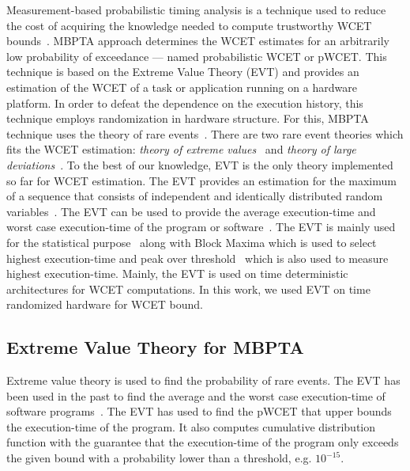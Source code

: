 Measurement-based probabilistic timing analysis is a technique used to reduce the cost of acquiring the knowledge needed to compute trustworthy WCET bounds~\cite{hansen2009statistical, cucu2012measurement, kosmidis2014pub}. MBPTA approach determines the WCET estimates for an arbitrarily low probability of exceedance --- named probabilistic WCET or pWCET. This technique is based on the Extreme Value Theory (EVT) and provides an estimation of the WCET of a task or application running on a hardware platform. In order to defeat the dependence on the execution history, this technique employs randomization in hardware structure. For this, MBPTA technique uses the theory of rare events~\cite{Cazorla:2013:PPA:2465787.2465796}. There are two rare event theories which fits the WCET estimation: \textit{theory of extreme values}~\cite{gumbel1954statistical} and \textit{theory of large deviations}~\cite{gumbel1954statistical}. To the best of our knowledge, EVT is the only theory implemented so far for WCET estimation. The EVT provides an estimation for the maximum of a sequence that consists of independent and identically distributed random variables~\cite{hoeffding1963probability}. The EVT can be used to provide the average execution-time and worst case execution-time of the program or software~\cite{cazorla2013upper,anwar2015probabilistically}. The EVT is mainly used for the statistical purpose~\cite{gumbel1954statistical} along with Block Maxima \cite{gumbel1954statistical} which is used to select highest execution-time and  peak over threshold~\cite{gumbel1954statistical} which is also used to measure highest execution-time. Mainly, the EVT is used on time deterministic architectures for WCET computations. In this work, we used EVT on time randomized hardware for WCET bound.

\subsection{Extreme Value Theory for MBPTA}


Extreme value theory is used to find the probability of rare events. The EVT has been used in the past to find the average and the worst case execution-time of software programs~\cite{altmeyer:spta}. The EVT has used to find the pWCET that upper bounds the execution-time of the program. It also computes cumulative distribution function with the guarantee that the execution-time of the program only exceeds the given bound with a probability lower than a threshold, e.g. $10^{-15}$.  



